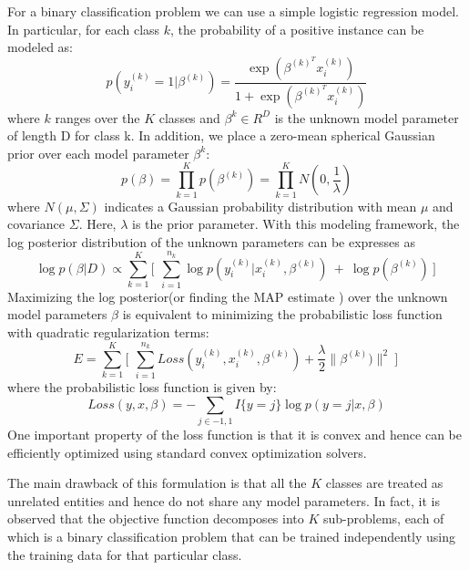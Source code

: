 \documentclass[10pt,twocolumn,letterpaper]{article}
\begin{document}
 For a binary classification problem we can use a simple logistic regression model. In particular, 
 for each class $k$, the probability of a positive instance can be modeled as: 
 \begin{equation}
 p(y_{i}^{(k)} = 1 | \beta^{(k)} )  = \frac { \exp( \beta^{(k)^{T}}  x_{i}^{(k)})  }{  1 + \exp(\beta^{(k)^{T}}  x_{i}^{(k)} ) } 
 \end{equation}
  where $k$ ranges over the $K$ classes and $ \beta^{k}  \in R^{D} $ is the unknown model parameter of length D 
  for class k. 
  In addition, we place a zero-mean spherical Gaussian prior over each model parameter  $  \beta^{k} $:
  \begin{equation}
	p(\beta)  = \prod_{k=1}^{K} p(\beta^{(k)}) = \prod_{k=1}^{K} N(0, \frac{1}{\lambda})
  \end{equation}
 where $N(\mu, \Sigma)$ indicates a Gaussian probability distribution with mean $\mu$ and covariance $\Sigma$.
 Here, $\lambda$ is the prior parameter.  With this modeling framework, the log posterior distribution of the unknown 
 parameters can be expresses as 
 \begin{equation}
	\log p(\beta | D) \propto \sum_{k=1}^{K} \Big[ \, \ \sum_{i=1}^{n_{k}} \log p(y_{i}^{(k)} | x_{i}^{(k)}, \beta^{(k)}) \ + \ \log p(\beta^{(k)}) \ \Big] \,
\end{equation}
 Maximizing the log posterior(or finding the MAP estimate ) over the unknown model parameters $\beta$  is  equivalent to 
 minimizing the probabilistic loss function with quadratic regularization terms:
 \begin{equation}
 	E = \sum_{k=1}^{K}  \Big[ \, \ \sum_{i=1}^{n_{k}} Loss(y_{i}^{(k)}, x_{i}^{(k)}, \beta^{(k)}) + \frac{\lambda}{2} \| \beta^{(k)}) \|^{2} \ \Big] \,
 \end{equation} 
 where the probabilistic loss function is given by:
 \begin{equation}
 Loss(y,  x,  \beta)  =  - \sum_{j \in {-1,1} } I\{y=j\} \log p(y=j | x,\beta)
\end{equation} 
One important property of the loss function is that it is convex and hence can be efficiently optimized
using standard convex optimization solvers.
 
 The main drawback of this formulation is that all the $K$ classes are treated as unrelated entities and hence 
 do not share any model parameters. In fact, it is observed that the objective function decomposes into 
 $K$ sub-problems, each of which is a binary classification problem that can be trained independently 
 using the training data for that particular class.
 
\end{document}
